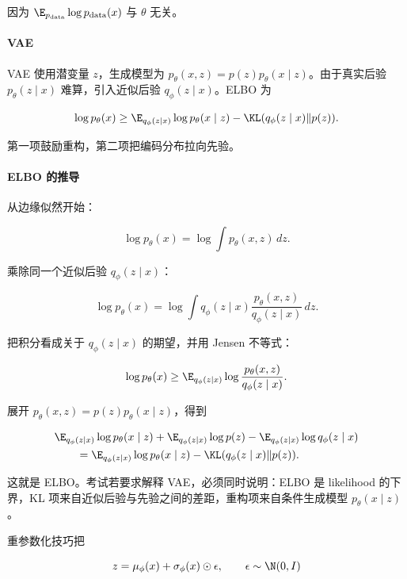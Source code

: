 因为 \(\E_{p_{\mathrm{data}}}\log p_{\mathrm{data}}(x)\) 与 \(\theta\) 无关。

\paragraph{VAE}


VAE 使用潜变量 \(z\)，生成模型为 \(p_\theta(x,z)=p(z)p_\theta(x\mid z)\)。由于真实后验 \(p_\theta(z\mid x)\) 难算，引入近似后验 \(q_\phi(z\mid x)\)。ELBO 为

\[
  \log p_\theta(x)
  \ge
  \E_{q_\phi(z\mid x)}
  \log p_\theta(x\mid z)
  -
  \KL(q_\phi(z\mid x)\|p(z)).
\]

第一项鼓励重构，第二项把编码分布拉向先验。

\paragraph{ELBO 的推导}

从边缘似然开始：

\[
  \log p_\theta(x)
  =
  \log
  \int p_\theta(x,z)\,dz.
\]

乘除同一个近似后验 \(q_\phi(z\mid x)\)：

\[
  \log p_\theta(x)
  =
  \log
  \int
  q_\phi(z\mid x)
  \frac{p_\theta(x,z)}{q_\phi(z\mid x)}
  \,dz.
\]

把积分看成关于 \(q_\phi(z\mid x)\) 的期望，并用 Jensen 不等式：

\[
  \log p_\theta(x)
  \ge
  \E_{q_\phi(z\mid x)}
  \log
  \frac{p_\theta(x,z)}{q_\phi(z\mid x)}.
\]

展开 \(p_\theta(x,z)=p(z)p_\theta(x\mid z)\)，得到

\[
\begin{aligned}
  &\E_{q_\phi(z\mid x)}\log p_\theta(x\mid z)
  +
  \E_{q_\phi(z\mid x)}\log p(z)
  -
  \E_{q_\phi(z\mid x)}\log q_\phi(z\mid x)
  \\
  &\qquad =
  \E_{q_\phi(z\mid x)}\log p_\theta(x\mid z)
  -
  \KL(q_\phi(z\mid x)\|p(z)).
\end{aligned}
\]

这就是 ELBO。考试若要求解释 VAE，必须同时说明：ELBO 是 likelihood 的下界，KL 项来自近似后验与先验之间的差距，重构项来自条件生成模型 \(p_\theta(x\mid z)\)。

重参数化技巧把

\[
  z=\mu_\phi(x)+\sigma_\phi(x)\odot\epsilon,
  \qquad
  \epsilon\sim\N(0,I)
\]

